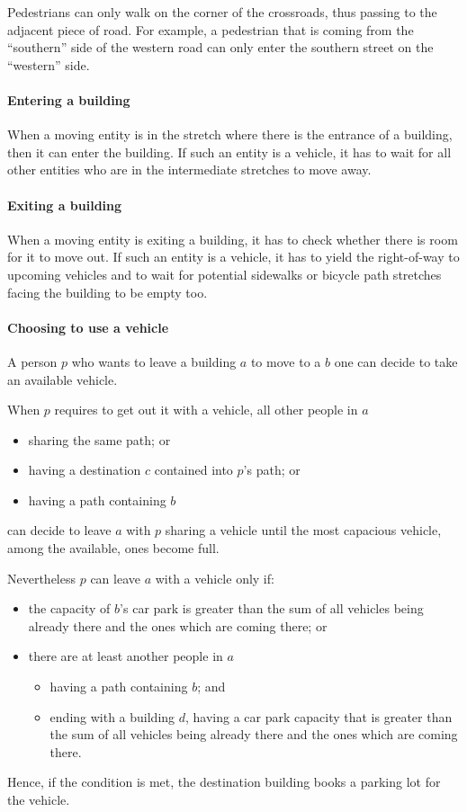 Pedestrians can only walk on the corner of the crossroads, thus passing to the
adjacent piece of road. For example, a pedestrian that is coming from 
the ``southern'' side of the western road can only enter the southern street 
on the ``western'' side.

\paragraph{Entering a building} When a moving entity is in the stretch where
there is the entrance of a building, then it can enter the building.
If such an entity is a vehicle, it has to wait for all other entities who
are in the intermediate stretches to move away.

\paragraph{Exiting a building} When a moving entity is exiting a building, it
has to check whether there is room for it to move out.
If such an entity is a vehicle, it has to yield the right-of-way to 
upcoming vehicles and to wait for potential sidewalks or bicycle path stretches 
facing the building to be empty too.

\paragraph{Choosing to use a vehicle} A person $p$ who wants to leave a
building $a$ to move to a $b$ one can decide to take an available vehicle.

When $p$ requires to get out it with a vehicle,
all other people in $a$
\begin{itemize}
  \item sharing the same path; or
  \item having a destination $c$ contained into $p$'s path; or
  \item having a path containing $b$
\end{itemize}
can decide to leave $a$ with $p$ sharing a vehicle
until the most capacious vehicle, among the available, ones become full.

Nevertheless $p$ can leave $a$ with a vehicle only if:
\begin{itemize}
  \item the capacity of $b$'s car park is greater than the sum of all 
vehicles being already there and the ones which are coming there; or
  \item there are at least another people in $a$ 
  \begin{itemize}
    \item having a path containing $b$; and
    \item ending with a building $d$, having a car park capacity that is greater than 
	the sum of all vehicles being already there and the ones which are coming there.
  \end{itemize}
\end{itemize}
Hence, if the condition is met, the destination building books a parking lot for the vehicle.

